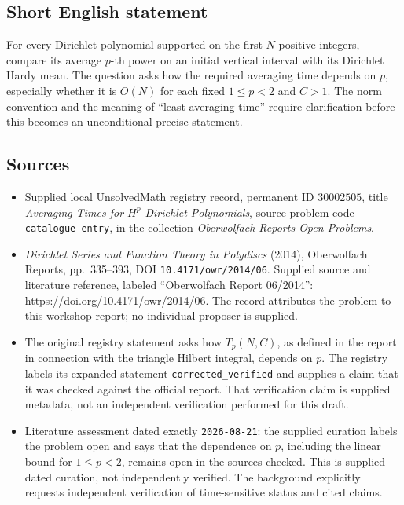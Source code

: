 \documentclass[11pt]{article}
\begin{document}
\subsection{Short English statement}
For every Dirichlet polynomial supported on the first \(N\) positive integers, compare its average \(p\)-th power on an initial vertical interval with its Dirichlet Hardy mean. The question asks how the required averaging time depends on \(p\), especially whether it is \(O(N)\) for each fixed \(1\leq p<2\) and \(C>1\). The norm convention and the meaning of ``least averaging time'' require clarification before this becomes an unconditional precise statement.
\subsection{Sources}
\begin{itemize}
\item Supplied local UnsolvedMath registry record, permanent ID \(30002505\), title \emph{Averaging Times for \(H^p\) Dirichlet Polynomials}, source problem code \texttt{catalogue entry}, in the collection \emph{Oberwolfach Reports Open Problems}.
\item \emph{Dirichlet Series and Function Theory in Polydiscs} (2014), Oberwolfach Reports, pp.\ 335--393, DOI \texttt{10.4171/owr/2014/06}. Supplied source and literature reference, labeled ``Oberwolfach Report 06/2014'': \url{https://doi.org/10.4171/owr/2014/06}. The record attributes the problem to this workshop report; no individual proposer is supplied.
\item The original registry statement asks how \(T_p(N,C)\), as defined in the report in connection with the triangle Hilbert integral, depends on \(p\). The registry labels its expanded statement \texttt{corrected\_verified} and supplies a claim that it was checked against the official report. That verification claim is supplied metadata, not an independent verification performed for this draft.
\item Literature assessment dated exactly \texttt{2026-08-21}: the supplied curation labels the problem open and says that the dependence on \(p\), including the linear bound for \(1\leq p<2\), remains open in the sources checked. This is supplied dated curation, not independently verified. The background explicitly requests independent verification of time-sensitive status and cited claims.
\end{itemize}
\end{document}
